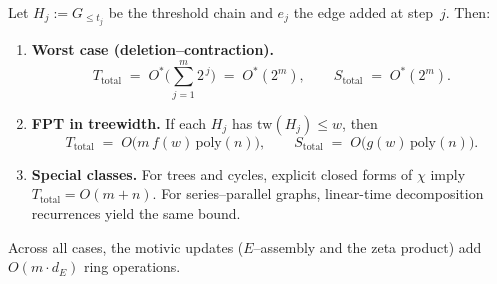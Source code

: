 \documentclass[runningheads]{llncs}
\begin{document}
\begin{theorem}[Complexity]\label{thm:complexity}
Let $H_j:=G_{\le t_j}$ be the threshold chain and $e_j$ the edge added at
step~$j$. Then:
\begin{enumerate}
  \item \textbf{Worst case (deletion–contraction).}
  \[
    T_{\mathrm{total}}
      \;=\;
      O^\ast\!\Big(\sum_{j=1}^{m} 2^{\,j}\Big)
      \;=\; O^\ast(2^m),
      \qquad
    S_{\mathrm{total}} \;=\; O^\ast(2^m).
  \]
  \item \textbf{FPT in treewidth.} If each $H_j$ has $\mathrm{tw}(H_j)\le w$, then
  \[
    T_{\mathrm{total}} \;=\; O\!\big(m\,f(w)\,\mathrm{poly}(n)\big),
    \qquad
    S_{\mathrm{total}} \;=\; O\!\big(g(w)\,\mathrm{poly}(n)\big).
  \]
  \item \textbf{Special classes.} 
  For trees and cycles, explicit closed forms of $\chi$ imply $T_{\mathrm{total}}=O(m+n)$. 
  For series–parallel graphs, linear-time decomposition recurrences yield the same bound.
\end{enumerate}
Across all cases, the motivic updates ($E$–assembly and the zeta product) add
$O(m\cdot d_E)$ ring operations.
\end{theorem}
\end{document}
